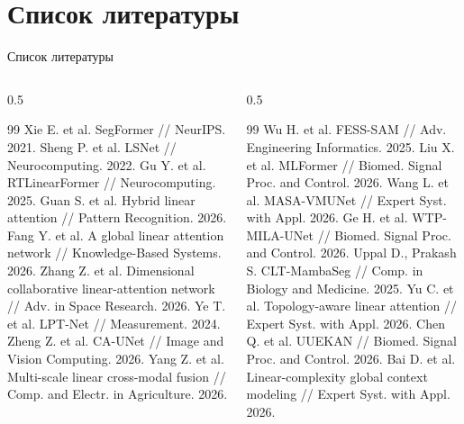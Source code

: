 \documentclass[10pt,aspectratio=169]{beamer}
\begin{document}
\section{Список литературы}
\begin{frame}[t]{Список литературы}
  \vspace{-0.2cm}
  \begin{columns}[T]
    \begin{column}{0.5\textwidth}
      \scriptsize
      \begin{thebibliography}{99}
         Xie E. et al. SegFormer // NeurIPS. 2021.
         Sheng P. et al. LSNet // Neurocomputing. 2022.
         Gu Y. et al. RTLinearFormer // Neurocomputing. 2025.
         Guan S. et al. Hybrid linear attention // Pattern Recognition. 2026.
         Fang Y. et al. A global linear attention network // Knowledge-Based Systems. 2026.
         Zhang Z. et al. Dimensional collaborative linear-attention network // Adv. in Space Research. 2026.
         Ye T. et al. LPT-Net // Measurement. 2024.
         Zheng Z. et al. CA-UNet // Image and Vision Computing. 2026.
         Yang Z. et al. Multi-scale linear cross-modal fusion // Comp. and Electr. in Agriculture. 2026.
      \end{thebibliography}
    \end{column}
    \begin{column}{0.5\textwidth}
      \scriptsize
      \begin{thebibliography}{99}
        \setcounter{enumiv}{9}
         Wu H. et al. FESS-SAM // Adv. Engineering Informatics. 2025.
         Liu X. et al. MLFormer // Biomed. Signal Proc. and Control. 2026.
         Wang L. et al. MASA-VMUNet // Expert Syst. with Appl. 2026.
         Ge H. et al. WTP-MILA-UNet // Biomed. Signal Proc. and Control. 2026.
         Uppal D., Prakash S. CLT-MambaSeg // Comp. in Biology and Medicine. 2025.
         Yu C. et al. Topology-aware linear attention // Expert Syst. with Appl. 2026.
         Chen Q. et al. UUEKAN // Biomed. Signal Proc. and Control. 2026.
         Bai D. et al. Linear-complexity global context modeling // Expert Syst. with Appl. 2026.
      \end{thebibliography}
    \end{column}
  \end{columns}
\end{frame}
\end{document}
